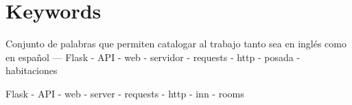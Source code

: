 \section{Keywords}

Conjunto de palabras que permiten catalogar al trabajo tanto sea en inglés como en español
—
Flask - API - web - servidor - requests - http - posada - habitaciones

Flask - API - web - server - requests - http - inn - rooms
